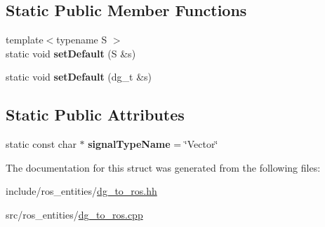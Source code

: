 \subsection*{Static Public Member Functions}
\begin{DoxyCompactItemize}
\item 
\mbox{\label{structdynamic__graph_1_1DgToRos_3_01Vector_01_4_a4013c3ef593096b73247ea076a67bcd0}} 
{\footnotesize template$<$typename S $>$ }\\static void {\bfseries set\+Default} (S \&s)
\item 
\mbox{\label{structdynamic__graph_1_1DgToRos_3_01Vector_01_4_a6036a3447dfb27b19bca8495651c2a01}} 
static void {\bfseries set\+Default} (dg\+\_\+t \&s)
\end{DoxyCompactItemize}
\subsection*{Static Public Attributes}
\begin{DoxyCompactItemize}
\item 
\mbox{\label{structdynamic__graph_1_1DgToRos_3_01Vector_01_4_a860bb1281b52ba284b82845c3a1d0f2f}} 
static const char $\ast$ {\bfseries signal\+Type\+Name} = \char`\"{}Vector\char`\"{}
\end{DoxyCompactItemize}


The documentation for this struct was generated from the following files\+:\begin{DoxyCompactItemize}
\item 
include/ros\+\_\+entities/\hyperlink{dg__to__ros_8hh}{dg\+\_\+to\+\_\+ros.\+hh}\item 
src/ros\+\_\+entities/\hyperlink{dg__to__ros_8cpp}{dg\+\_\+to\+\_\+ros.\+cpp}\end{DoxyCompactItemize}
